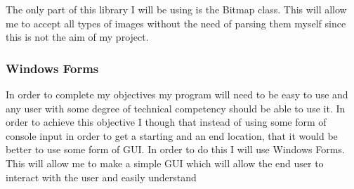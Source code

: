 \begin{flushleft}
    The only part of this library I will be using is the Bitmap class. This will allow me to accept all types of images without the need of parsing them myself since this is not the aim of my project. 
    \\ \bk

    \subsubsection*{Windows Forms}
    In order to complete my objectives my program will need to be easy to use and any user with some degree of technical competency should be able to use it. In order to achieve this objective I though that instead of using some form of console input in order to get a starting and an end location, that it would be better to use some form of GUI. In order to do this I will use Windows Forms. This will allow me to make a simple GUI which will allow the end user to interact with the user and easily understand 


    \\ \bk



\end{flushleft}